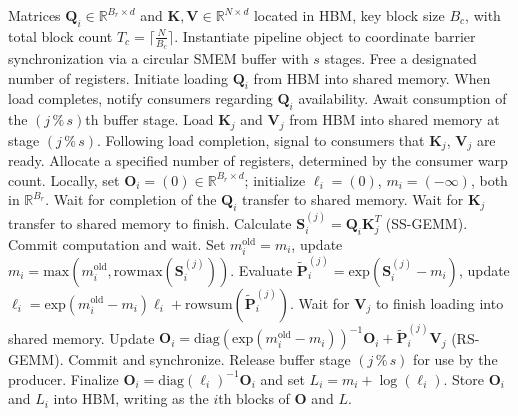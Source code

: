 \begin{algorithm}[H]
    \caption{\small\label{alg:flash3_wgmma_ws_only}\textsc{FlashAttention-3} forward pass \textbf{excluding} intra-consumer overlapping -- CTA perspective}
    \begin{algorithmic}[1]
\REQUIRE Matrices $\mathbf{Q}_i \in \mathbb{R}^{B_r \times d}$ and $\mathbf{K}, \mathbf{V} \in \mathbb{R}^{N \times d}$ located in HBM, key block size $B_c$, with total block count $T_c = \lceil \frac{N}{B_c} \rceil$.
\STATE Instantiate pipeline object to coordinate barrier synchronization via a circular SMEM buffer with $s$ stages.
\STATE Free a designated number of registers.
\STATE Initiate loading $\mathbf{Q}_i$ from HBM into shared memory.
\STATE When load completes, notify consumers regarding $\mathbf{Q}_i$ availability.
    \STATE Await consumption of the $(j\,\%\,s)$th buffer stage.
    \STATE Load $\mathbf{K}_j$ and $\mathbf{V}_j$ from HBM into shared memory at stage $(j\,\%\,s)$.
    \STATE Following load completion, signal to consumers that $\mathbf{K}_j$, $\mathbf{V}_j$ are ready.
\ENDFOR
\ELSE \STATE Allocate a specified number of registers, determined by the consumer warp count.
\STATE Locally, set $\mathbf{O}_i = (0) \in \mathbb{R}^{B_r \times d}$; initialize $\ell_i = (0)$, $m_i = (-\infty)$, both in $\mathbb{R}^{B_r}$.
\STATE Wait for completion of the $\mathbf{Q}_i$ transfer to shared memory.
\STATE Wait for $\mathbf{K}_j$ transfer to shared memory to finish.
\STATE Calculate $\mathbf{S}_i^{(j)} = \mathbf{Q}_i \mathbf{K}_j^T$ (SS-GEMM). Commit computation and wait. \label{alg:ws_only_gemm1}
\STATE Set $m_i^{\mathrm{old}} = m_i$, update $m_i = \mathrm{max}(m_i^{\mathrm{old}}, \mathrm{rowmax}(\mathbf{S}_i^{(j)}))$. \label{code-ws:softmax_start}
\STATE Evaluate $\widetilde{\mathbf{P}}_i^{(j)} = \mathrm{exp}(\mathbf{S}_i^{(j)} - m_i)$, update $\ell_i = \mathrm{exp}(m_i^{\mathrm{old}} - m_i) \ell_i + \mathrm{rowsum}(\widetilde{\mathbf{P}}_i^{(j)})$. \label{code-ws:softmax_end}
\STATE Wait for $\mathbf{V}_j$ to finish loading into shared memory.
\STATE Update $\mathbf{O}_i = \mathrm{diag}(\mathrm{exp}(m_i^{\mathrm{old}} - m_i))^{-1} \mathbf{O}_i + \widetilde{\mathbf{P}}_i^{(j)} \mathbf{V}_j$ (RS-GEMM). Commit and synchronize. \label{alg:ws_only_gemm2}
\STATE Release buffer stage $(j\,\%\,s)$ for use by the producer.
\ENDFOR
\STATE Finalize $\mathbf{O}_i = \mathrm{diag}(\ell_i)^{-1} \mathbf{O}_i$ and set $L_i = m_i + \log(\ell_i)$.
\STATE Store $\mathbf{O}_i$ and $L_i$ into HBM, writing as the $i$th blocks of $\mathbf{O}$ and $L$.
\ENDIF
\end{algorithmic}
\end{algorithm}

